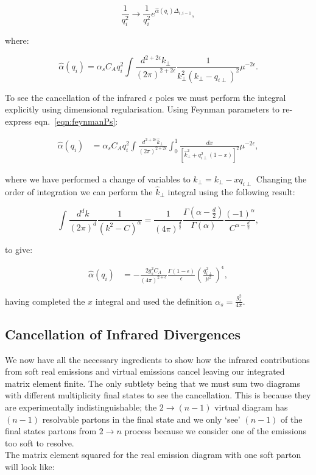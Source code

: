 		\begin{equation}
			\frac{1}{q_i^2}\longrightarrow\frac{1}{q_i^2}e^{\hat{\alpha}(q_i)\Delta_{i,i-1}},
		\end{equation}

		where:

		\begin{equation}
			\hat{\alpha}(q_i) = \alpha_sC_Aq_i^2\int \frac{d^{2+2\epsilon}k_{\perp}}{(2\pi)^{2+2\epsilon}}
			\frac{1}{k^2_\perp(k_\perp - q_{i\perp})^2}\mu^{-2\epsilon}.
			\label{eqn:feynmanPs}
		\end{equation}

		To see the cancellation of the infrared $\epsilon$ poles we must perform the integral
		explicitly using dimensional regularisation. Using Feynman parameters to re-express
		eqn.~\eqref{eqn:feynmanPs}:

		\begin{align}
			\hat{\alpha}(q_i) &= \alpha_sC_Aq_i^2\int \frac{d^{2+2\epsilon}\hat{k}_{\perp}}{(2\pi)^{2+2\epsilon}}\int_0^1
				\frac{dx}{[\hat{k}^2 _\perp + q_{i\perp}^2(1-x)]^2}\mu^{-2\epsilon},
		\end{align}

		where we have performed a change of variables to $\hat{k}_\perp = k_\perp - xq_{i\perp}$
		Changing the order of integration we can perform the $\hat{k}_\perp$ integral
		using the following result:

		\begin{equation}
			\int \frac{d^dk}{(2\pi)^d}\frac{1}{(k^2 - C)^\alpha} = \frac{1}{(4\pi)^{\frac{d}{2}}}
				\frac{\Gamma(\alpha - \frac{d}{2})}{\Gamma(\alpha)}
				\frac{(-1)^\alpha}{C^{\alpha - \frac{d}{2}}},
		\end{equation}

		to give:

		\begin{align}
			\hat{\alpha}(q_i) &= -\frac{2g_s^2C_A}{(4\pi)^{2+\epsilon}}\frac{\Gamma(1-\epsilon)}{\epsilon}
			\left(\frac{q_{i\perp}^2}{\mu^2}\right)^\epsilon,
		\end{align}

		having completed the $x$ integral and used the definition $\alpha_s=\frac{g_s^2}{4\pi}$.

	\subsection{Cancellation of Infrared Divergences}
		\label{sub:cancellation}

		We now have all the necessary ingredients to show how the infrared contributions from
		soft real emissions and virtual emissions cancel leaving our integrated matrix element
		finite.  The only subtlety being that we must sum two diagrams with different multiplicity
		final states to see the cancellation.  This is because they are experimentally indistinguishable;
		the $2\rightarrow (n-1)$ virtual diagram has $(n-1)$ resolvable partons in the final state
		and we only `see' $(n-1)$ of the final states partons from $2\rightarrow n$ process because
		we consider one of the emissions too soft to resolve.\\
		The matrix element squared for the real emission diagram with one soft parton
		will look like:

